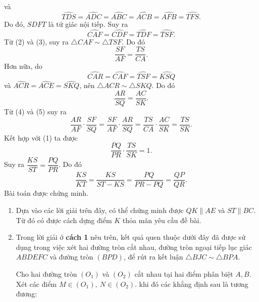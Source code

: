 \begin{bt}
{{}
		\noindent và
		\[\widehat{TDS}=\widehat{ADC}=\widehat{ABC}=\widehat{ACB}=\widehat{AFB}=\widehat{TFS}.\]
		Do đó, $SDFT$ là tứ giác nội tiếp. Suy ra 
		\[\widehat{CAF}=\widehat{CDF}=\widehat{TDF}=\widehat{TSF}.\tag{3}\]
		Từ (2) và (3), suy ra $\triangle CAF \sim \triangle TSF$. Do đó 
		\[\dfrac{SF}{AF}=\dfrac{TS}{CA}.\tag{4}\]
		Hơn nữa, do 
		\[\widehat{CAR}=\widehat{CAF}=\widehat{TSF}=\widehat{KSQ}\]
		và $\widehat{ACR}=\widehat{ACE}=\widehat{SKQ}$, nên $\triangle ACR \sim \triangle SKQ$. Do đó
		\[\dfrac{AR}{SQ}=\dfrac{AC}{SK}.\tag{5}\]
		Từ (4) và (5) suy ra 
		\[\dfrac{AR}{AF}\cdot\dfrac{SF}{SQ}=\dfrac{SF}{AF}\cdot\dfrac{AR}{SQ}=\dfrac{TS}{CA}\cdot\dfrac{AC}{SK}=\dfrac{TS}{SK}.\]
		Kết hợp với (1) ta được
		\[\dfrac{PQ}{PR}\cdot\dfrac{TS}{SK}=1.\]
		Suy ra $\dfrac{KS}{ST}=\dfrac{PQ}{PR}$. Do đó
		\[\dfrac{KS}{KT}=\dfrac{KS}{ST-KS}=\dfrac{PQ}{PR-PQ}=\dfrac{QP}{QR}.\]
		Bài toán được chứng minh.
		\begin{nx}\hfill
			\begin{enumerate}[1.]
				\item Dựa vào các lời giải trên đây, có thể chứng minh được $QK\parallel AE$ và $ST\parallel BC$. Từ đó có được cách dựng điểm $K$ thỏa mãn yêu cầu đề bài.
				\item Trong lời giải ở \textbf{cách 1} nêu trên, kết quả quen thuộc dưới đây đã được sử dụng trong việc xét hai đường tròn cắt nhau, đường tròn ngoại tiếp lục giác $ABDEFC$ và đường tròn $(BPD)$, để rút ra kết luận $\triangle BJC \sim \triangle BPA$.
				\begin{bode}
					Cho hai đường tròn $(O_1)$ và $(O_2)$ cắt nhau tại hai điểm phân biệt $A,B$. Xét các điểm $M\in (O_1),~N\in (O_2)$. khi đó các khẳng định sau là tương đương:

\end{bode}
\end{enumerate}
\end{nx}}
\end{bt}
